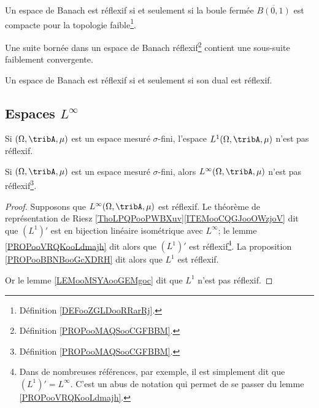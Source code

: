 \begin{theorem}       \label{THOooTFIHooPQjVAr}
	Un espace de Banach est réflexif si et seulement si la boule fermée \( \overline{ B(0,1) }\) est compacte pour la topologie faible\footnote{Définition \ref{DEFooZGLDooRRarRj}.}.
\end{theorem}

\begin{proposition}       \label{PROPooPVVYooMZjQSq}
	Une suite bornée dans un espace de Banach réflexif\footnote{Définition \ref{PROPooMAQSooCGFBBM}.} contient une sous-suite faiblement convergente.
\end{proposition}

\begin{proposition}       \label{PROPooBBNBooGcXDRH}
	Un espace de Banach est réflexif si et seulement si son dual est réflexif.
\end{proposition}

\subsection{Espaces \texorpdfstring{\(  L^{\infty}\)}{Linfinity}}

\begin{lemma}        \label{LEMooMSYAooGEMgoc}
	Si \( (\Omega,\tribA,\mu)\) est un espace mesuré \( \sigma\)-fini, l'espace \( L^1(\Omega,\tribA,\mu)\) n'est pas réflexif.
\end{lemma}

\begin{lemma}     \label{LEMooUSXTooFvpsVd}
	Si \( (\Omega,\tribA,\mu)\) est un espace mesuré \( \sigma\)-fini, alors \( L^{\infty}(\Omega,\tribA,\mu)\) n'est pas réflexif\footnote{Définition \ref{PROPooMAQSooCGFBBM}.}.
\end{lemma}

\begin{proof}
	Supposons que \( L^{\infty}(\Omega,\tribA,\mu)\) est réflexif. Le théorème de représentation de Riesz \ref{ThoLPQPooPWBXuv}\ref{ITEMooCQGJooOWzjoV} dit que \( (L^1)'\) est en bijection linéaire isométrique avec \( L^{\infty}\); le lemme \ref{PROPooVRQKooLdmajh} dit alors que \( (L^1)'\) est réflexif\footnote{Dans de nombreuses références, par exemple\cite{BIBooFDGQooYferue}, il est simplement dit que \( (L^1)'=L^{\infty}\). C'est un abus de notation qui permet de se passer du lemme \ref{PROPooVRQKooLdmajh}.}. La proposition \ref{PROPooBBNBooGcXDRH} dit alors que \( L^1\) est réflexif.

	Or le lemme \ref{LEMooMSYAooGEMgoc} dit que \( L^1\) n'est pas réflexif.
\end{proof}

